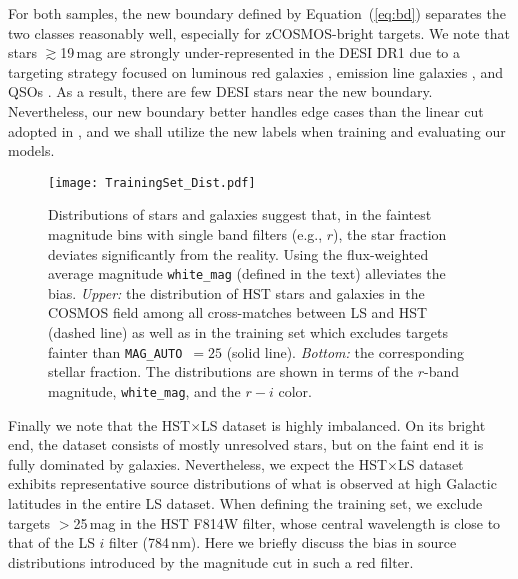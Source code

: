 \documentclass[twocolumn]{aastex631}
\newcommand{\magauto}{\texttt{MAG\_AUTO}}
\newcommand{\dr}[1]{DR{#1}}
\begin{document}
\begin{CJK*}{UTF8}{gbsn}
For both samples, the new boundary defined by Equation~(\ref{eq:bd}) separates the two classes reasonably well, especially for zCOSMOS-bright targets. We note that stars $\gtrsim$19\,mag are strongly under-represented in the DESI \dr{1} due to a targeting strategy focused on luminous red galaxies \citep[LRGs;][]{DESI_LRG_2023}, emission line galaxies \citep[ELGs;][]{DESI_ELG_2023}, and QSOs \citep{DESI_QSO_2023}. As a result, there are few DESI stars near the new boundary. Nevertheless, our new boundary better handles edge cases than the linear cut adopted in \cite{Leauthaud_2007}, and we shall utilize the new labels when training and evaluating our models.

\begin{figure*}
    \centering
    \texttt{[image: TrainingSet\_Dist.pdf]}
    \caption{Distributions of stars and galaxies suggest that, in the faintest magnitude bins with single band filters (e.g., $r$), the star fraction deviates significantly from the reality. Using the flux-weighted average magnitude \texttt{white\_mag} (defined in the text) alleviates the bias.
    {\it Upper:} the distribution of HST stars and galaxies in the COSMOS field among all cross-matches between LS and HST (dashed line) as well as in the training set which excludes targets fainter than \magauto\ $=25$ (solid line). {\it Bottom:} the corresponding stellar fraction. The distributions are shown in terms of the $r$-band magnitude, \texttt{white\_mag}, and the $r-i$ color.}
    \label{fig:bias}
\end{figure*}

Finally we note that the HST$\times$LS dataset is highly imbalanced. On its bright end, the dataset consists of mostly unresolved stars, but on the faint end it is fully dominated by galaxies. Nevertheless, we expect the HST$\times$LS dataset exhibits representative source distributions of what is observed at high Galactic latitudes in the entire LS dataset. When defining the training set, we exclude targets $>$25\,mag in the HST F814W filter, whose central wavelength is close to that of the LS $i$ filter (784\,nm). Here we briefly discuss the bias in source distributions introduced by the magnitude cut in such a red filter. 


\end{CJK*}
\end{document}
